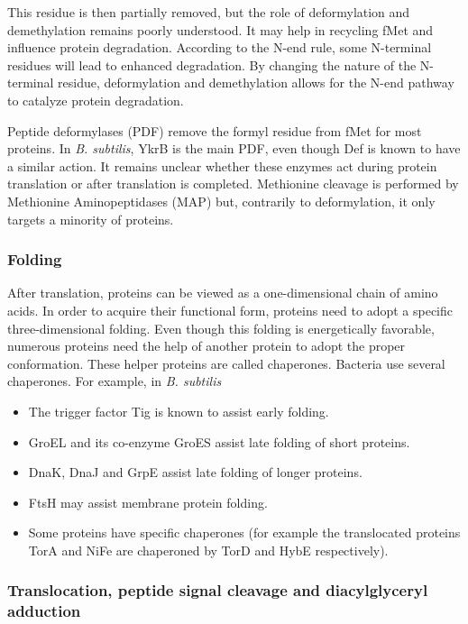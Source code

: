 This residue is then partially removed, but the role of deformylation and demethylation remains poorly understood. It may help in recycling fMet and influence protein degradation. According to the N-end rule, some N-terminal residues will lead to enhanced degradation. By changing the nature of the N-terminal residue, deformylation and demethylation allows for the N-end pathway to catalyze protein degradation.

Peptide deformylases (PDF) remove the formyl residue from fMet for most proteins. In \textit{B. subtilis}, YkrB is the main PDF, even though Def is known to have a similar action. It remains unclear whether these enzymes act during protein translation or after translation is completed. Methionine cleavage is performed by Methionine Aminopeptidases (MAP) but, contrarily to deformylation, it only targets a minority of proteins.

\subsubsection{Folding}

After translation, proteins can be viewed as a one-dimensional chain of amino acids. In order to acquire their functional form, proteins need to adopt a specific three-dimensional folding. Even though this folding is energetically favorable, numerous proteins need the help of another protein to adopt the proper conformation. These helper proteins are called chaperones. Bacteria use several chaperones. For example, in \textit{B. subtilis}
\begin{itemize}
\item The trigger factor Tig is known to assist early folding.
\item GroEL and its co-enzyme GroES assist late folding of short proteins.
\item DnaK, DnaJ and GrpE assist late folding of longer proteins.
\item FtsH may assist membrane protein folding.
\item Some proteins have specific chaperones (for example the translocated proteins TorA and NiFe are chaperoned by TorD and HybE respectively).
\end{itemize}

\subsubsection{Translocation, peptide signal cleavage and diacylglyceryl adduction}

